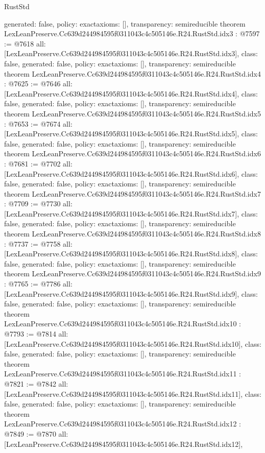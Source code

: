 \begin{lexlean}{RustStd}
\begin{coremodule}
{  generated: false,
  policy: exact{axioms: []},
  transparency: semireducible
}
theorem LexLeanPreserve.Cc639d244984595f0311043c4c505146e.R24.RustStd.idx3 : @7597 := @7618 {
  all: [LexLeanPreserve.Cc639d244984595f0311043c4c505146e.R24.RustStd.idx3],
  class: false,
  generated: false,
  policy: exact{axioms: []},
  transparency: semireducible
}
theorem LexLeanPreserve.Cc639d244984595f0311043c4c505146e.R24.RustStd.idx4 : @7625 := @7646 {
  all: [LexLeanPreserve.Cc639d244984595f0311043c4c505146e.R24.RustStd.idx4],
  class: false,
  generated: false,
  policy: exact{axioms: []},
  transparency: semireducible
}
theorem LexLeanPreserve.Cc639d244984595f0311043c4c505146e.R24.RustStd.idx5 : @7653 := @7674 {
  all: [LexLeanPreserve.Cc639d244984595f0311043c4c505146e.R24.RustStd.idx5],
  class: false,
  generated: false,
  policy: exact{axioms: []},
  transparency: semireducible
}
theorem LexLeanPreserve.Cc639d244984595f0311043c4c505146e.R24.RustStd.idx6 : @7681 := @7702 {
  all: [LexLeanPreserve.Cc639d244984595f0311043c4c505146e.R24.RustStd.idx6],
  class: false,
  generated: false,
  policy: exact{axioms: []},
  transparency: semireducible
}
theorem LexLeanPreserve.Cc639d244984595f0311043c4c505146e.R24.RustStd.idx7 : @7709 := @7730 {
  all: [LexLeanPreserve.Cc639d244984595f0311043c4c505146e.R24.RustStd.idx7],
  class: false,
  generated: false,
  policy: exact{axioms: []},
  transparency: semireducible
}
theorem LexLeanPreserve.Cc639d244984595f0311043c4c505146e.R24.RustStd.idx8 : @7737 := @7758 {
  all: [LexLeanPreserve.Cc639d244984595f0311043c4c505146e.R24.RustStd.idx8],
  class: false,
  generated: false,
  policy: exact{axioms: []},
  transparency: semireducible
}
theorem LexLeanPreserve.Cc639d244984595f0311043c4c505146e.R24.RustStd.idx9 : @7765 := @7786 {
  all: [LexLeanPreserve.Cc639d244984595f0311043c4c505146e.R24.RustStd.idx9],
  class: false,
  generated: false,
  policy: exact{axioms: []},
  transparency: semireducible
}
theorem LexLeanPreserve.Cc639d244984595f0311043c4c505146e.R24.RustStd.idx10 : @7793 := @7814 {
  all: [LexLeanPreserve.Cc639d244984595f0311043c4c505146e.R24.RustStd.idx10],
  class: false,
  generated: false,
  policy: exact{axioms: []},
  transparency: semireducible
}
theorem LexLeanPreserve.Cc639d244984595f0311043c4c505146e.R24.RustStd.idx11 : @7821 := @7842 {
  all: [LexLeanPreserve.Cc639d244984595f0311043c4c505146e.R24.RustStd.idx11],
  class: false,
  generated: false,
  policy: exact{axioms: []},
  transparency: semireducible
}
theorem LexLeanPreserve.Cc639d244984595f0311043c4c505146e.R24.RustStd.idx12 : @7849 := @7870 {
  all: [LexLeanPreserve.Cc639d244984595f0311043c4c505146e.R24.RustStd.idx12],
}
\end{coremodule}
\end{lexlean}
